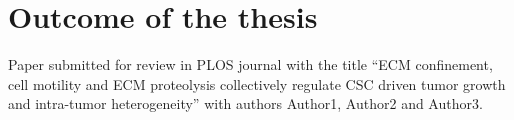 \chapter*{Outcome of the thesis}

Paper submitted for review in PLOS journal with the title ``ECM confinement, cell motility and ECM proteolysis
collectively regulate CSC driven tumor growth and
intra-tumor heterogeneity'' with authors Author1, Author2 and Author3.

